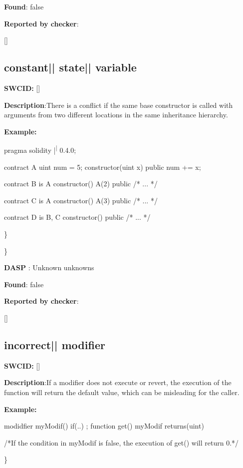 \documentclass{article}
\begin{document}
\textbf{Found}: false

\textbf{Reported by checker}: 
\begin{ffcode} 

[]
\end{ffcode} 
\subsection{constant{|\textunderscore| }state{|\textunderscore| }variable} 
\textbf{SWC{\textunderscore }ID:} []

\textbf{Description}:There is a conflict if the same base constructor is called with arguments from two different locations in the same inheritance hierarchy.


\textbf{Example:} 
\begin{ffcode} 

pragma solidity |\textsuperscript| 0.4.0;

contract A{
    uint num = 5;
    constructor(uint x) public{
        num += x;
    }
}

contract B is A{
    constructor() A(2) public { /* ... */ }
}

contract C is A {
    constructor() A(3) public { /* ... */ }
}

contract D is B, C {
    constructor() public { /* ... */ }
}

\end{ffcode} 
\} 

\} 

\textbf{DASP} : Unknown unknowns

\textbf{Found}: false

\textbf{Reported by checker}: 
\begin{ffcode} 

[]
\end{ffcode} 
\subsection{incorrect{|\textunderscore| }modifier} 
\textbf{SWC{\textunderscore }ID:} []

\textbf{Description}:If a modifier does not execute \textunderscore  or revert, the execution of the function will return the default value, which can be misleading for the caller.


\textbf{Example:} 
\begin{ffcode} 

modidfier myModif(){
    if(..){
      \textunderscore ;
    }
}
function get() myModif returns(uint){}

 /*If the condition in myModif is false, the execution of get() will return 0.*/ 

\end{ffcode} 
\} 
\end{document}
